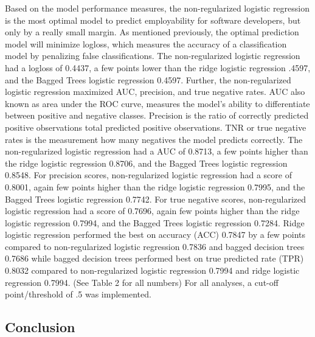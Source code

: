\documentclass[
  man]{apa6}
\begin{document}
Based on the model performance measures, the non-regularized logistic regression is the most optimal model to predict employability for software developers, but only by a really small margin. As mentioned previously, the optimal prediction model will minimize logloss, which measures the accuracy of a classification model by penalizing false classifications. The non-regularized logistic regression had a logloss of 0.4437, a few points lower than the ridge logistic regression .4597, and the Bagged Trees logistic regression 0.4597. Further, the non-regularized logistic regression maximized AUC, precision, and true negative rates. AUC also known as area under the ROC curve, measures the model's ability to differentiate between positive and negative classes. Precision is the ratio of correctly predicted positive observations total predicted positive observations. TNR or true negative rates is the measurement how many negatives the model predicts correctly. The non-regularized logistic regression had a AUC of 0.8713, a few points higher than the ridge logistic regression 0.8706, and the Bagged Trees logistic regression 0.8548. For precision scores, non-regularized logistic regression had a score of 0.8001, again few points higher than the ridge logistic regression 0.7995, and the Bagged Trees logistic regression 0.7742. For true negative scores, non-regularized logistic regression had a score of 0.7696, again few points higher than the ridge logistic regression 0.7994, and the Bagged Trees logistic regression 0.7284. Ridge logistic regression performed the best on accuracy (ACC) 0.7847 by a few points compared to non-regularized logistic regression 0.7836 and bagged decision trees 0.7686 while bagged decision trees performed best on true predicted rate (TPR) 0.8032 compared to non-regularized logistic regression 0.7994 and ridge logistic regression 0.7994. (See Table 2 for all numbers) For all analyses, a cut-off point/threshold of .5 was implemented.

\hypertarget{conclusion}{%
\subsection{Conclusion}\label{conclusion}}
\end{document}
